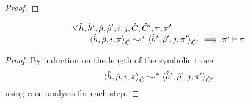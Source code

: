 \begin{proof}
\end{proof}

\begin{lemma}\label{lemma:pc:monotonocity}
$$
\begin{array}{l}
\forall \, \sheap, \sheap', \sstore, \sstore', i, j, \sctx, \sctx', \pc, \pc' \, . \,  \\ 
\qquad \symbtranstrans{\sheap, \sstore, i, \pc}{\sheap', \sstore', j, \pc'}[\sctx][\sctx']  
   \implies \pc' \vdash \pc
\end{array}
$$
\end{lemma}
\begin{proof}
By induction on the length of the symbolic trace $$\symbtranstrans{\sheap, \sstore, i, \pc}{\sheap', \sstore', j, \pc'}[\sctx][\sctx']$$ 
using case analysis for each step. 
\end{proof}


